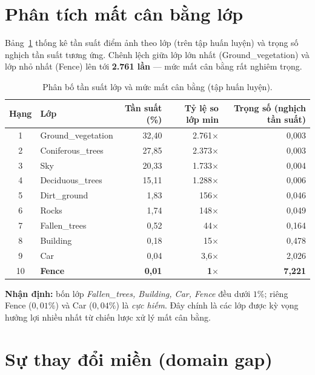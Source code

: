 \section{Phân tích mất cân bằng lớp}
\label{sec:imbalance_data}

Bảng~\ref{tab:imbalance} thống kê tần suất điểm ảnh theo lớp (trên tập huấn luyện) và
trọng số nghịch tần suất tương ứng. Chênh lệch giữa lớp lớn nhất
(Ground\_vegetation) và lớp nhỏ nhất (Fence) lên tới \textbf{2.761 lần} --- mức mất
cân bằng rất nghiêm trọng.

\begin{table}[H]
\centering
\caption{Phân bố tần suất lớp và mức mất cân bằng (tập huấn luyện).}
\label{tab:imbalance}
\small
\begin{tabular}{c l r r r}
\toprule
\textbf{Hạng} & \textbf{Lớp} & \textbf{Tần suất (\%)} & \textbf{Tỷ lệ so lớp min} & \textbf{Trọng số (nghịch tần suất)} \\
\midrule
1  & Ground\_vegetation & 32{,}40 & 2.761$\times$ & 0{,}003 \\
2  & Coniferous\_trees  & 27{,}85 & 2.373$\times$ & 0{,}003 \\
3  & Sky                & 20{,}33 & 1.733$\times$ & 0{,}004 \\
4  & Deciduous\_trees   & 15{,}11 & 1.288$\times$ & 0{,}006 \\
5  & Dirt\_ground       & 1{,}83  & 156$\times$   & 0{,}046 \\
6  & Rocks              & 1{,}74  & 148$\times$   & 0{,}049 \\
7  & Fallen\_trees      & 0{,}52  & 44$\times$    & 0{,}164 \\
8  & Building           & 0{,}18  & 15$\times$    & 0{,}478 \\
9  & Car                & 0{,}04  & 3{,}6$\times$ & 2{,}026 \\
10 & \textbf{Fence}     & \textbf{0{,}01} & \textbf{1$\times$} & \textbf{7{,}221} \\
\bottomrule
\end{tabular}
\end{table}

\noindent\textbf{Nhận định:} bốn lớp \textit{Fallen\_trees, Building, Car, Fence}
đều dưới $1\%$; riêng Fence ($0{,}01\%$) và Car ($0{,}04\%$) là \textit{cực hiếm}.
Đây chính là các lớp được kỳ vọng hưởng lợi nhiều nhất từ chiến lược xử lý mất cân
bằng.

\section{Sự thay đổi miền (domain gap)}

